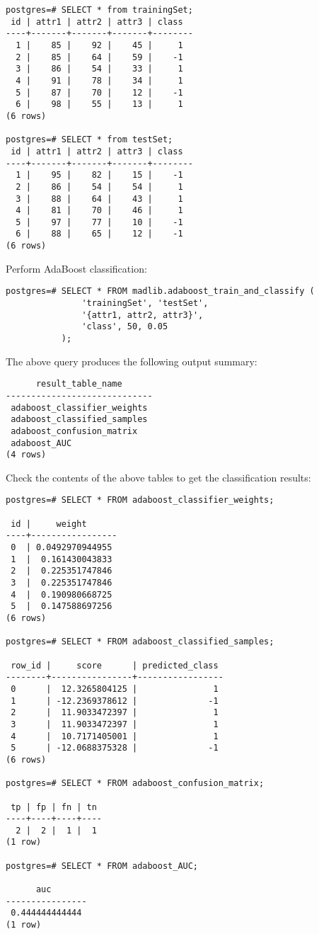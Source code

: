 \begin{verbatim}
postgres=# SELECT * from trainingSet;
 id | attr1 | attr2 | attr3 | class 
----+-------+-------+-------+--------
  1 |    85 |    92 |    45 |     1 
  2 |    85 |    64 |    59 |    -1 
  3 |    86 |    54 |    33 |     1 
  4 |    91 |    78 |    34 |     1 
  5 |    87 |    70 |    12 |    -1 
  6 |    98 |    55 |    13 |     1 
(6 rows)

postgres=# SELECT * from testSet;
 id | attr1 | attr2 | attr3 | class 
----+-------+-------+-------+--------
  1 |    95 |    82 |    15 |    -1 
  2 |    86 |    54 |    54 |     1 
  3 |    88 |    64 |    43 |     1 
  4 |    81 |    70 |    46 |     1 
  5 |    97 |    77 |    10 |    -1 
  6 |    88 |    65 |    12 |    -1 
(6 rows)
\end{verbatim}

{\raggedleft Perform AdaBoost classification:}

\begin{verbatim}
postgres=# SELECT * FROM madlib.adaboost_train_and_classify (
               'trainingSet', 'testSet', 
               '{attr1, attr2, attr3}', 
               'class', 50, 0.05
           );
\end{verbatim}

{\raggedleft The above query produces the following output summary:}

\begin{verbatim}
      result_table_name      
-----------------------------
 adaboost_classifier_weights
 adaboost_classified_samples
 adaboost_confusion_matrix
 adaboost_AUC
(4 rows)
\end{verbatim}

{\raggedleft Check the contents of the above tables to get the classification results:}

\begin{verbatim}
postgres=# SELECT * FROM adaboost_classifier_weights;

 id |     weight      
----+-----------------
 0  | 0.0492970944955
 1  |  0.161430043833
 2  |  0.225351747846
 3  |  0.225351747846
 4  |  0.190980668725
 5  |  0.147588697256
(6 rows)

postgres=# SELECT * FROM adaboost_classified_samples;

 row_id |     score      | predicted_class 
--------+----------------+-----------------
 0      |  12.3265804125 |               1
 1      | -12.2369378612 |              -1
 2      |  11.9033472397 |               1
 3      |  11.9033472397 |               1
 4      |  10.7171405001 |               1
 5      | -12.0688375328 |              -1
(6 rows)

postgres=# SELECT * FROM adaboost_confusion_matrix;

 tp | fp | fn | tn 
----+----+----+----
  2 |  2 |  1 |  1
(1 row)

postgres=# SELECT * FROM adaboost_AUC;

      auc       
----------------
 0.444444444444
(1 row)

\end{verbatim}





